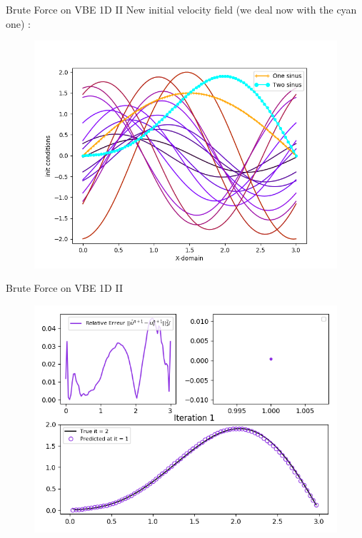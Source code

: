 \documentclass[10pt,
			   xcolor=svgnames,
			   hyperref={linkcolor=red, citecolor = DarkGreen, colorlinks=true, urlcolor=Navy}]{beamer}
\newcommand\bk{\color{black}}
\begin{document}
\begin{frame}{Brute Force on VBE 1D II}
	New initial velocity field (we deal now with the \color{cyan} cyan \bk one) : 
\vspace{-0.3cm}	
	\begin{figure}[H]
	\centering
	\includegraphics[scale=0.5]{Initialisation_cases_Last.png}
	\end{figure}
\end{frame}

\begin{frame}{Brute Force on VBE 1D II}
	\begin{figure}[H]
	\centering
	\includegraphics[scale=0.5]{Pres_First_Iteration_2.png}
	\end{figure} 
\end{frame}
\end{document}
